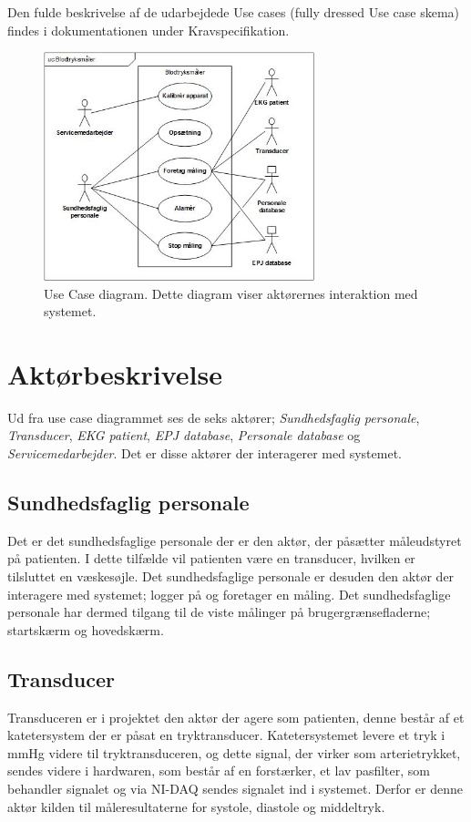 Den fulde beskrivelse af de udarbejdede Use cases (fully dressed Use case skema) findes i dokumentationen under Kravspecifikation.
\begin{figure}[H]
\includegraphics[width =0.7\textwidth , center]{billeder/UseCaseDiagram}
\caption{Use Case diagram. Dette diagram viser aktørernes interaktion med systemet.}
\end{figure}
\section{Aktørbeskrivelse}
Ud fra use case diagrammet ses de seks aktører; \textit{Sundhedsfaglig personale}, \textit{Transducer}, \textit{EKG patient}, \textit{EPJ database}, \textit{Personale database} og \textit{Servicemedarbejder}. Det er disse aktører der interagerer med systemet.
\subsection{Sundhedsfaglig personale}
Det er det sundhedsfaglige personale der er den aktør, der påsætter måleudstyret på patienten. I dette tilfælde vil patienten være en transducer, hvilken er tilsluttet en væskesøjle. Det sundhedsfaglige personale er desuden den aktør der interagere med systemet; logger på og foretager en måling. Det sundhedsfaglige personale har dermed tilgang til de viste målinger på brugergrænsefladerne; startskærm og hovedskærm.
\subsection{Transducer}
Transduceren er i projektet den aktør der agere som patienten, denne består af et katetersystem der er påsat en tryktransducer. Katetersystemet levere et tryk i mmHg videre til tryktransduceren, og dette signal, der virker som arterietrykket, sendes videre i hardwaren, som består af en forstærker, et lav pasfilter, som behandler signalet og via NI-DAQ sendes signalet ind i systemet. Derfor er denne aktør kilden til måleresultaterne for systole, diastole og middeltryk. 
